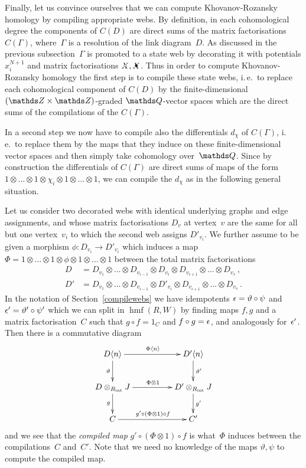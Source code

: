\documentclass{compositio}
\theoremstyle{definition}
\numberwithin{equation}{section}
\DeclareMathOperator{\hmf}{hmf}
\begin{document}
\medskip

Finally, let us convince ourselves that we can compute Khovanov-Rozansky homology by compiling appropriate webs. By definition, in each cohomological degree the components of $C(D)$ are direct sums of the matrix factorisations $C(\Gamma)$, where~$\Gamma$ is a resolution of the link diagram~$D$. As discussed in the previous subsection~$\Gamma$ is promoted to a state web by decorating it with potentials $x_{i}^{N+1}$ and matrix factorisations $\Xcirc, \Xbul$. Thus in order to compute Khovanov-Rozansky homology the first step is to compile these state webs, i.\,e.~to replace each cohomological component of $C(D)$ by the finite-dimensional $(\nZ\times\nZ)$-graded $\nQ$-vector spaces which are the direct sums of the compilations of the $C(\Gamma)$. 

In a second step we now have to compile also the differentials $d_{\chi}$ of $C(\Gamma)$, i.\,e.~to replace them by the maps that they induce on these finite-dimensional vector spaces and then simply take cohomology over~$\nQ$. Since by construction the differentials of $C(\Gamma)$ are direct sums of maps of the form $1\otimes\ldots\otimes 1\otimes\chi_{i}\otimes 1\otimes\ldots\otimes 1$, we can compile the $d_{\chi}$ as in the following general situation. 

Let us consider two decorated webs with identical underlying graphs and edge assignments, and whose matrix factorisations $D_{v}$ at vertex~$v$ are the same for all but one vertex~$v_{i}$ to which the second web assigns $D'_{v_{i}}$. We further assume to be given a morphism $\phi:D_{v_{i}}\longrightarrow D'_{v_{i}}$ which induces a map $\Phi=1\otimes\ldots\otimes 1\otimes\phi\otimes 1\otimes\ldots\otimes 1$ between the total matrix factorisations
\begin{align*}
D & =D_{v_{1}}\otimes\ldots\otimes D_{v_{i-1}} \otimes D_{v_{i}} \otimes D_{v_{i+1}}\otimes\ldots\otimes D_{v_{s}} \, , \\
D' & =D_{v_{1}}\otimes\ldots\otimes D_{v_{i-1}} \otimes D'_{v_{i}} \otimes D_{v_{i+1}}\otimes\ldots\otimes D_{v_{s}} \, .
\end{align*}
In the notation of Section~\ref{compilewebs} we have idempotents $\epsilon=\vartheta\circ\psi$ and $\epsilon'=\vartheta'\circ\psi'$ which we can split in $\hmf(R,W)$ by finding maps $f,g$ and a matrix factorisation~$C$ such that $g\circ f= 1_{C}$ and $f\circ g=\epsilon$, and analogously for~$\epsilon'$. Then there is a commutative diagram
$$
\xymatrix@C+2pc{%
D\langle n\rangle \ar[d]_{\vartheta}\ar[r]^{\Phi\langle n\rangle} & D'\langle n\rangle\ar[d]^{\vartheta'}\\
D \otimes_{\rint} J \ar[d]_{g}\ar[r]^{\Phi \otimes 1} & D' \otimes_{\rint} J\ar[d]^{g'}\\
C \ar[r]^{g' \circ (\Phi \otimes 1) \circ f} & C'
}
$$
and we see that the \emph{compiled map} $g'\circ(\Phi\otimes 1)\circ f$ is what~$\Phi$ induces between the compilations~$C$ and~$C'$. Note that we need no knowledge of the maps $\vartheta,\psi$ to compute the compiled map. 
\end{document}
